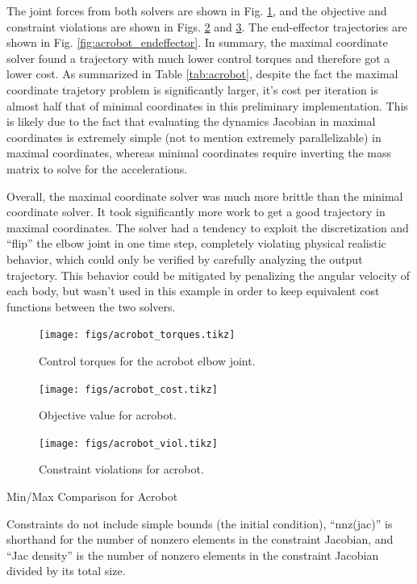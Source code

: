 \documentclass[conference]{IEEEtran}
\begin{document}
The joint forces from both solvers are shown in Fig. \ref{fig:acrobot_torques}, and the 
objective and constraint violations are shown in Figs. \ref{fig:acrobot_cost} and 
\ref{fig:acrobot_viol}. The end-effector trajectories are shown in Fig. 
\ref{fig:acrobot_endeffector}. In summary, the maximal coordinate solver found a trajectory 
with much lower control torques and therefore got a lower cost. As summarized in Table 
\ref{tab:acrobot}, despite the fact the maximal coordinate trajetory problem is significantly
larger, it's cost per iteration is almost half that of minimal coordinates in this 
preliminary implementation. This is likely due to the fact that evaluating the dynamics Jacobian
in maximal coordinates is extremely simple (not to mention extremely parallelizable) in 
maximal coordinates, whereas minimal coordinates require inverting the mass matrix to solve 
for the accelerations. 

Overall, the maximal coordinate solver was much more brittle than the minimal coordinate 
solver. It took significantly more work to get a good trajectory in maximal coordinates. 
The solver had a tendency to exploit the discretization and ``flip'' the elbow joint in 
one time step, completely violating physical realistic behavior, which could only be 
verified by carefully analyzing the output trajectory. This behavior could be mitigated by 
penalizing the angular velocity of each body, but wasn't used in this example in order to 
keep equivalent cost functions between the two solvers.

\begin{figure}
    \centering
    \texttt{[image: figs/acrobot\_torques.tikz]}
    \caption{Control torques for the acrobot elbow joint.}
    \label{fig:acrobot_torques}
\end{figure}
\begin{figure}
    \centering
    \texttt{[image: figs/acrobot\_cost.tikz]}
    \caption{Objective value for acrobot.}
    \label{fig:acrobot_cost}
\end{figure}
\begin{figure}
    \centering
    \texttt{[image: figs/acrobot\_viol.tikz]}
    \caption{Constraint violations for acrobot.}
    \label{fig:acrobot_viol}
\end{figure}

\begin{table}
    \centering 
    \caption{Min/Max Comparison for Acrobot}
    
    \caption*{ \small
        Constraints do not include simple bounds (the initial condition), ``nnz(jac)'' 
        is shorthand for the number of nonzero elements in the constraint Jacobian, and 
        ``Jac density'' is the number of nonzero elements in the constraint Jacobian 
        divided by its total size.
    }
    \label{tab:acrobot}
\end{table}
\end{document}
